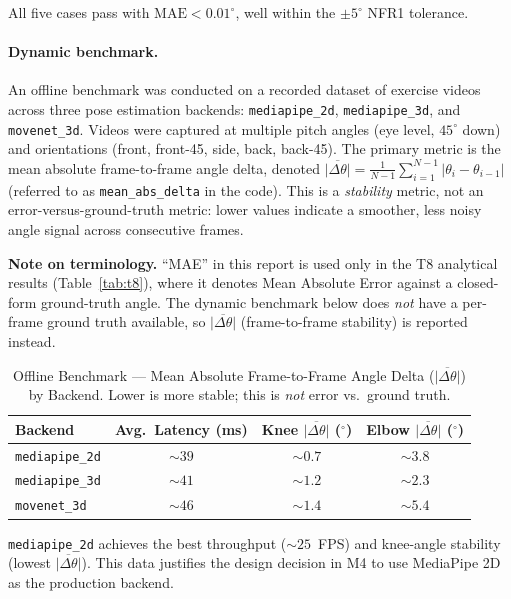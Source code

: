 \documentclass[12pt, titlepage]{article}
\begin{document}
All five cases pass with $\text{MAE} < 0.01^\circ$, well within the
$\pm 5^\circ$ NFR1 tolerance.

\paragraph{Dynamic benchmark.}
An offline benchmark was conducted on a recorded dataset of exercise videos
across three pose estimation backends: \texttt{mediapipe\_2d},
\texttt{mediapipe\_3d}, and \texttt{movenet\_3d}. Videos were captured at
multiple pitch angles (eye level, $45^\circ$ down) and orientations (front,
front-45, side, back, back-45). The primary metric is the mean absolute
frame-to-frame angle delta, denoted
$\overline{|\Delta\theta|} = \frac{1}{N{-}1}\sum_{i=1}^{N-1}|\theta_i - \theta_{i-1}|$
(referred to as \texttt{mean\_abs\_delta} in the code). This is a
\emph{stability} metric, not an error-versus-ground-truth metric: lower values
indicate a smoother, less noisy angle signal across consecutive frames.

\noindent\textbf{Note on terminology.} ``MAE'' in this report is used only in
the T8 analytical results (Table~\ref{tab:t8}), where it denotes
Mean Absolute Error against a closed-form ground-truth angle. The dynamic
benchmark below does \emph{not} have a per-frame ground truth available, so
$\overline{|\Delta\theta|}$ (frame-to-frame stability) is reported instead.

\begin{table}[H]
\centering
\begin{tabular}{l c c c}
\toprule
\textbf{Backend} & \textbf{Avg.\ Latency (ms)} & \textbf{Knee $\overline{|\Delta\theta|}$ ($^\circ$)} & \textbf{Elbow $\overline{|\Delta\theta|}$ ($^\circ$)}\\
\midrule
\texttt{mediapipe\_2d} & $\sim 39$ & $\sim 0.7$ & $\sim 3.8$\\
\texttt{mediapipe\_3d} & $\sim 41$ & $\sim 1.2$ & $\sim 2.3$\\
\texttt{movenet\_3d}   & $\sim 46$ & $\sim 1.4$ & $\sim 5.4$\\
\bottomrule
\end{tabular}
\caption{Offline Benchmark --- Mean Absolute Frame-to-Frame Angle Delta ($\overline{|\Delta\theta|}$) by Backend. Lower is more stable; this is \emph{not} error vs.\ ground truth.}
\label{tab:offline}
\end{table}

\texttt{mediapipe\_2d} achieves the best throughput ($\sim 25$~FPS) and
knee-angle stability (lowest $\overline{|\Delta\theta|}$). This data justifies
the design decision in M4 to use MediaPipe 2D as the production backend.
\end{document}
